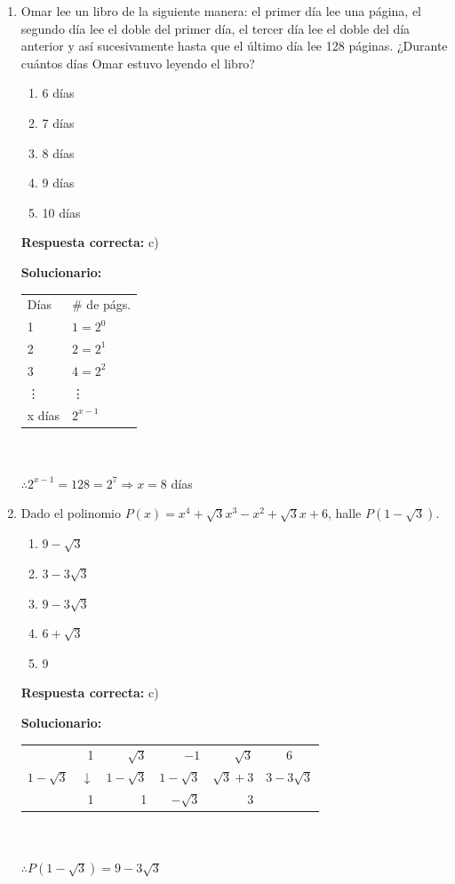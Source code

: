 \begin{enumerate}
	
	\item Omar lee un libro de la siguiente manera: el primer día lee una página, el segundo día lee el doble del primer día, el tercer día lee el doble del día anterior y así sucesivamente hasta que el último día lee 128 páginas. ¿Durante cuántos días Omar estuvo leyendo el libro?
	\begin{enumerate}[label=\alph*)]
		\item 6 días
		\item 7 días
		\item 8 días
		\item 9 días
		\item 10 días
	\end{enumerate}
	\textbf{Respuesta correcta:} c)
	
	\vspace{2mm}
	\textbf{Solucionario:}\\
	\begin{tabular}{ll}
		Días & \# de págs. \\
		1 & $1 = 2^0$ \\
		2 & $2 = 2^1$ \\
		3 & $4 = 2^2$ \\
		\vdots & \vdots \\
		x días & $2^{x-1}$
	\end{tabular} \\
	\\
	$\therefore 2^{x-1} = 128 = 2^7 \Rightarrow x = 8$ días
	
	\vspace{6mm}
	
	\item Dado el polinomio $P(x) = x^4 + \sqrt{3}x^3 - x^2 + \sqrt{3}x + 6$, halle $P(1-\sqrt{3})$.
	\begin{enumerate}[label=\alph*)]
		\item $9 - \sqrt{3}$
		\item $3 - 3\sqrt{3}$
		\item $9 - 3\sqrt{3}$
		\item $6 + \sqrt{3}$
		\item 9
	\end{enumerate}
	\textbf{Respuesta correcta:} c)
	
	\vspace{2mm}
	\textbf{Solucionario:}\\
	\begin{tabular}{r|rrrr|c}
		& 1 & $\sqrt{3}$ & $-1$ & $\sqrt{3}$ & 6 \\
		$1-\sqrt{3}$ & $\downarrow$ & $1-\sqrt{3}$ & $1-\sqrt{3}$ & $\sqrt{3}+3$ & $3-3\sqrt{3}$ \\ \hline
		& 1 & 1 & $-\sqrt{3}$ & 3 & \fbox{$9-3\sqrt{3}$}
	\end{tabular} \\
	\\
	$\therefore P(1-\sqrt{3}) = 9-3\sqrt{3}$
	

\end{enumerate}
